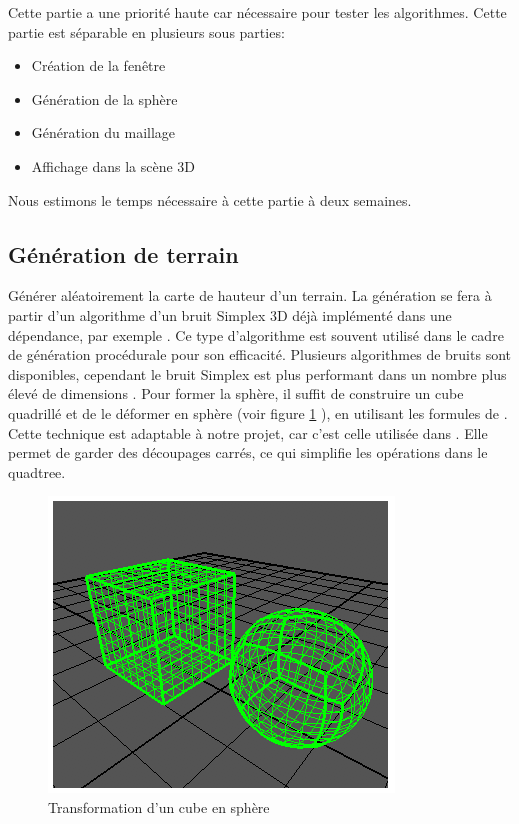 \documentclass[12pt]{report}
\begin{document}
Cette partie a une priorité haute car nécessaire pour tester les
algorithmes. Cette partie est séparable en plusieurs sous parties:
\begin{itemize}
  \item Création de la fenêtre
  \item Génération de la sphère
  \item Génération du maillage
  \item Affichage dans la scène 3D
\end{itemize}
Nous estimons le temps nécessaire à cette partie à deux semaines.

\subsection{Génération de terrain}


Générer aléatoirement la carte de hauteur d'un terrain.  La génération
se fera à partir d'un algorithme d'un bruit Simplex 3D déjà implémenté
dans une dépendance, par exemple \cite{libnoise}. Ce type d'algorithme
est souvent utilisé dans le cadre de génération procédurale pour son
efficacité. Plusieurs algorithmes de bruits sont disponibles, cependant
le bruit Simplex est plus performant dans un nombre plus élevé de
dimensions \cite{Simplexnoise}.  Pour former la sphère, il suffit de
construire un cube quadrillé et de le déformer en sphère (voir figure
\ref{fig:Cubetosphere} ), en utilisant les formules de
\cite{Cube2Sphere}. Cette technique est adaptable à notre projet, car
c'est celle utilisée dans \cite{WorldGenerator}. Elle permet de garder
des découpages carrés, ce qui simplifie les opérations dans le
quadtree.\\

\begin{center}
\begin{figure}[!h]
  \includegraphics[scale=1]{img/Cubetosphere.png}
  \caption{Transformation d'un cube en sphère \cite{Cube2Sphere}}
  \label{fig:Cubetosphere}
\end{figure}
\end{center}
\end{document}
